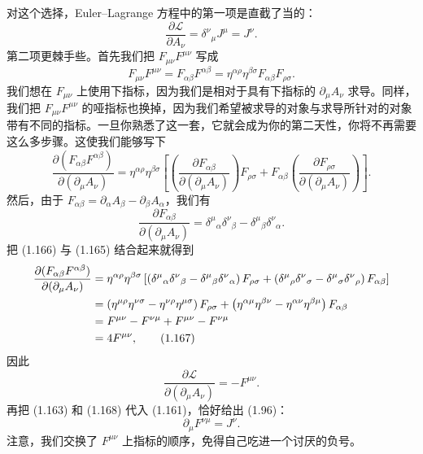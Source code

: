 对这个选择，Euler--Lagrange 方程中的第一项是直截了当的：
\begin{equation*}
\frac{\partial\mathcal{L}}{\partial A_{\nu}} = \delta^{\nu}{}_{\mu}J^{\mu} = J^{\nu}.
\tag{1.163}
\end{equation*}
第二项更棘手些。首先我们把 $F_{\mu\nu}F^{\mu\nu}$ 写成
\begin{equation*}
F_{\mu\nu}F^{\mu\nu} = F_{\alpha\beta}F^{\alpha\beta} = \eta^{\alpha\rho}\eta^{\beta\sigma}F_{\alpha\beta}F_{\rho\sigma}.
\tag{1.164}
\end{equation*}
我们想在 $F_{\mu\nu}$ 上使用下指标，因为我们是相对于具有下指标的 $\partial_{\mu}A_{\nu}$ 求导。同样，我们把 $F_{\mu\nu}F^{\mu\nu}$ 的哑指标也换掉，因为我们希望被求导的对象与求导所针对的对象带有不同的指标。一旦你熟悉了这一套，它就会成为你的第二天性，你将不再需要这么多步骤。这使我们能够写下
\begin{equation*}
\frac{\partial(F_{\alpha\beta}F^{\alpha\beta})}{\partial(\partial_{\mu}A_{\nu})} = \eta^{\alpha\rho}\eta^{\beta\sigma}\left[\left(\frac{\partial F_{\alpha\beta}}{\partial(\partial_{\mu}A_{\nu})}\right)F_{\rho\sigma} + F_{\alpha\beta}\left(\frac{\partial F_{\rho\sigma}}{\partial(\partial_{\mu}A_{\nu})}\right)\right].
\tag{1.165}
\end{equation*}
然后，由于 $F_{\alpha\beta}=\partial_{\alpha}A_{\beta}-\partial_{\beta}A_{\alpha}$，我们有
\begin{equation*}
\frac{\partial F_{\alpha\beta}}{\partial(\partial_{\mu}A_{\nu})} = \delta^{\mu}{}_{\alpha}\delta^{\nu}{}_{\beta} - \delta^{\mu}{}_{\beta}\delta^{\nu}{}_{\alpha}.
\tag{1.166}
\end{equation*}
把 (1.166) 与 (1.165) 结合起来就得到
\begin{align*}
\frac{\partial(F_{\alpha\beta}F^{\alpha\beta})}{\partial(\partial_{\mu}A_{\nu})} &= \eta^{\alpha\rho}\eta^{\beta\sigma}\left[\left(\delta^{\mu}{}_{\alpha}\delta^{\nu}{}_{\beta} - \delta^{\mu}{}_{\beta}\delta^{\nu}{}_{\alpha}\right)F_{\rho\sigma} + \left(\delta^{\mu}{}_{\rho}\delta^{\nu}{}_{\sigma} - \delta^{\mu}{}_{\sigma}\delta^{\nu}{}_{\rho}\right)F_{\alpha\beta}\right]\notag\\
&= \left(\eta^{\mu\rho}\eta^{\nu\sigma} - \eta^{\nu\rho}\eta^{\mu\sigma}\right)F_{\rho\sigma} + \left(\eta^{\alpha\mu}\eta^{\beta\nu} - \eta^{\alpha\nu}\eta^{\beta\mu}\right)F_{\alpha\beta}\notag\\
&= F^{\mu\nu} - F^{\nu\mu} + F^{\mu\nu} - F^{\nu\mu}\notag\\
&= 4F^{\mu\nu},
\tag{1.167}
\end{align*}
因此
\begin{equation*}
\frac{\partial\mathcal{L}}{\partial(\partial_{\mu}A_{\nu})} = -F^{\mu\nu}.
\tag{1.168}
\end{equation*}
再把 (1.163) 和 (1.168) 代入 (1.161)，恰好给出 (1.96)：
\begin{equation*}
\partial_{\mu}F^{\nu\mu} = J^{\nu}.
\tag{1.169}
\end{equation*}
注意，我们交换了 $F^{\mu\nu}$ 上指标的顺序，免得自己吃进一个讨厌的负号。

